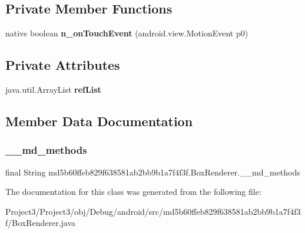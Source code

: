 \subsection*{Private Member Functions}
\begin{DoxyCompactItemize}
\item 
\mbox{\label{classmd5b60ffeb829f638581ab2bb9b1a7f4f3f_1_1BoxRenderer_a532fa996338f3b4215d83e4573b83166}} 
native boolean {\bfseries n\+\_\+on\+Touch\+Event} (android.\+view.\+Motion\+Event p0)
\end{DoxyCompactItemize}
\subsection*{Private Attributes}
\begin{DoxyCompactItemize}
\item 
\mbox{\label{classmd5b60ffeb829f638581ab2bb9b1a7f4f3f_1_1BoxRenderer_aa0eecfeb6a77a84fb7b0b7562f7b7d6e}} 
java.\+util.\+Array\+List {\bfseries ref\+List}
\end{DoxyCompactItemize}


\subsection{Member Data Documentation}
\mbox{\label{classmd5b60ffeb829f638581ab2bb9b1a7f4f3f_1_1BoxRenderer_a5d93612d5b0a73e4f90ab9f50db54f92}} 
\subsubsection{\texorpdfstring{\+\_\+\+\_\+md\+\_\+methods}{\_\_md\_methods}}
{\footnotesize\ttfamily final String md5b60ffeb829f638581ab2bb9b1a7f4f3f.\+Box\+Renderer.\+\_\+\+\_\+md\+\_\+methods\hspace{0.3cm}{\ttfamily [static]}}



The documentation for this class was generated from the following file\+:\begin{DoxyCompactItemize}
\item 
Project3/\+Project3/obj/\+Debug/android/src/md5b60ffeb829f638581ab2bb9b1a7f4f3f/Box\+Renderer.\+java\end{DoxyCompactItemize}
